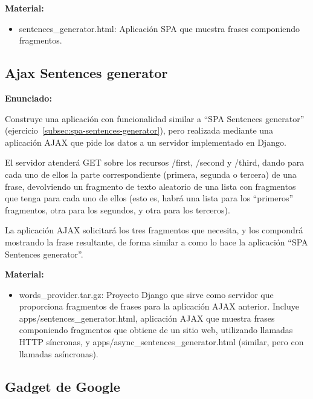 \textbf{Material:}
\begin{itemize}
\item sentences\_generator.html: Aplicación SPA que muestra frases componiendo fragmentos.
\end{itemize}

\subsection{Ajax Sentences generator}
\label{subsec:ajax-sentences-generator}

\textbf{Enunciado:}

Construye una aplicación con funcionalidad similar a ``SPA Sentences generator'' (ejercicio~\ref{subsec:spa-sentences-generator}), pero realizada mediante una aplicación AJAX que pide los datos a un servidor implementado en Django.

El servidor atenderá GET sobre los recursos /first, /second y /third, dando para cada uno de ellos la parte correspondiente (primera, segunda o tercera) de una frase, devolviendo un fragmento de texto aleatorio de una lista con fragmentos que tenga para cada uno de ellos (esto es, habrá una lista para los ``primeros'' fragmentos, otra para los segundos, y otra para los terceros).

La aplicación AJAX solicitará los tres fragmentos que necesita, y los compondrá mostrando la frase resultante, de forma similar a como lo hace la aplicación ``SPA Sentences generator''.

\textbf{Material:}

\begin{itemize}
\item words\_provider.tar.gz: Proyecto Django que sirve como servidor que proporciona fragmentos de frases para la aplicación AJAX anterior. Incluye apps/sentences\_generator.html, aplicación AJAX que muestra frases componiendo fragmentos que obtiene de un sitio web, utilizando llamadas HTTP síncronas, y apps/async\_sentences\_generator.html (similar, pero con llamadas asíncronas).
\end{itemize}

\subsection{Gadget de Google}
\label{subsec:gadget-google}

